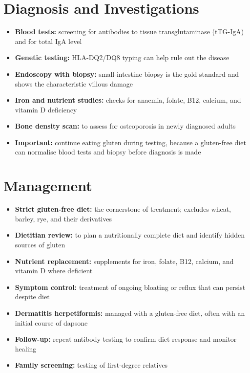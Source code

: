 \section*{Diagnosis and Investigations}
\begin{itemize}
    \item \textbf{Blood tests:} screening for antibodies to tissue transglutaminase (tTG-IgA) and for total IgA level
    \item \textbf{Genetic testing:} HLA-DQ2/DQ8 typing can help rule out the disease
    \item \textbf{Endoscopy with biopsy:} small-intestine biopsy is the gold standard and shows the characteristic villous damage
    \item \textbf{Iron and nutrient studies:} checks for anaemia, folate, B12, calcium, and vitamin D deficiency
    \item \textbf{Bone density scan:} to assess for osteoporosis in newly diagnosed adults
    \item \textbf{Important:} continue eating gluten during testing, because a gluten-free diet can normalise blood tests and biopsy before diagnosis is made
\end{itemize}

\section*{Management}
\begin{itemize}
    \item \textbf{Strict gluten-free diet:} the cornerstone of treatment; excludes wheat, barley, rye, and their derivatives
    \item \textbf{Dietitian review:} to plan a nutritionally complete diet and identify hidden sources of gluten
    \item \textbf{Nutrient replacement:} supplements for iron, folate, B12, calcium, and vitamin D where deficient
    \item \textbf{Symptom control:} treatment of ongoing bloating or reflux that can persist despite diet
    \item \textbf{Dermatitis herpetiformis:} managed with a gluten-free diet, often with an initial course of dapsone
    \item \textbf{Follow-up:} repeat antibody testing to confirm diet response and monitor healing
    \item \textbf{Family screening:} testing of first-degree relatives
\end{itemize}

